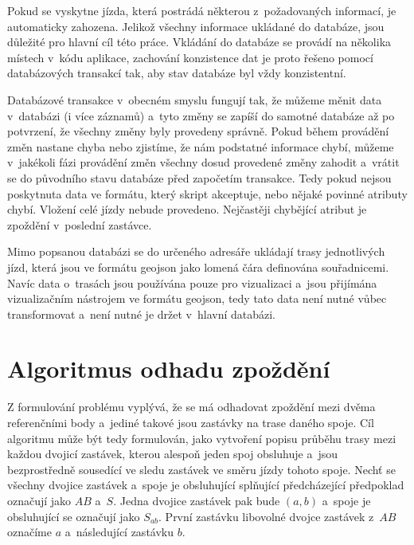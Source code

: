 \bigbreak

Pokud se vyskytne jízda, která postrádá některou z~požadovaných informací, je automaticky zahozena. Jelikož všechny informace ukládané do databáze, jsou důležité pro hlavní cíl této práce. Vkládání do databáze se provádí na několika místech v~kódu aplikace, zachování konzistence dat je proto řešeno pomocí databázových transakcí tak, aby stav databáze byl vždy konzistentní.


\bigbreak

Databázové transakce v~obecném smyslu fungují tak, že můžeme měnit data v~databázi (i více záznamů) a~tyto změny se zapíší do samotné databáze až po potvrzení, že všechny změny byly provedeny správně. Pokud během provádění změn nastane chyba nebo zjistíme, že nám podstatné informace chybí, můžeme v~jakékoli fázi provádění změn všechny dosud provedené změny zahodit a~vrátit se do původního stavu databáze před započetím transakce. Tedy pokud nejsou poskytnuta data ve formátu, který skript akceptuje, nebo nějaké povinné atributy chybí. Vložení celé jízdy nebude provedeno. Nejčastěji chybějící atribut je zpoždění v~poslední zastávce.


\bigbreak

Mimo popsanou databázi se do určeného adresáře ukládají trasy jednotlivých jízd, která jsou ve formátu \gls{geojson} jako lomená čára definována souřadnicemi. Navíc data o~trasách jsou používána pouze pro vizualizaci a~jsou přijímána vizualizačním nástrojem ve formátu \gls{geojson}, tedy tato data není nutné vůbec transformovat a~není nutné je držet v~hlavní databázi.


\section{Algoritmus odhadu zpoždění}

Z formulování problému vyplývá, že se má odhadovat zpoždění mezi dvěma referenčními body a~jediné takové jsou zastávky na trase daného spoje. Cíl algoritmu může být tedy formulován, jako vytvoření popisu průběhu trasy mezi každou dvojicí zastávek, kterou alespoň jeden spoj obsluhuje a~jsou bezprostředně sousedící ve sledu zastávek ve směru jízdy tohoto spoje. Nechť se všechny dvojice zastávek a~spoje je obsluhující splňující předcházející předpoklad označují jako $AB$ a~$S$. Jedna dvojice zastávek pak bude $(a, b)$ a~spoje je obsluhující se označují jako $S_{ab}$. První zastávku libovolné dvojce zastávek z~$AB$ označíme $a$ a~následující zastávku $b$.


